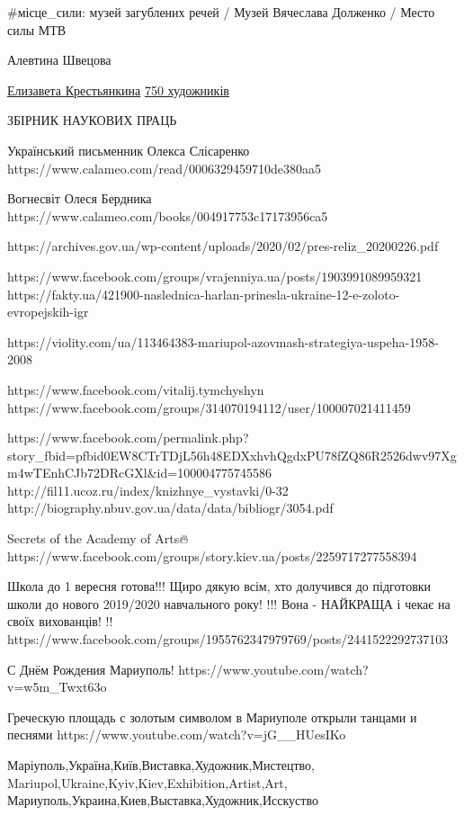 
#місце_сили: музей загублених речей / Музей Вячеслава Долженко / Место силы МТВ 

Алевтина Швецова

\href{https://www.facebook.com/lizakrestiankina}{Елизавета Крестьянкина}
\href{https://www.facebook.com/groups/1013559558679300}{750 художників}

ЗБІРНИК НАУКОВИХ ПРАЦЬ

Український письменник Олекса Слісаренко
https://www.calameo.com/read/0006329459710de380aa5

Вогнесвіт Олеся Бердника
https://www.calameo.com/books/004917753c17173956ca5

https://archives.gov.ua/wp-content/uploads/2020/02/pres-reliz_20200226.pdf

https://www.facebook.com/groups/vrajenniya.ua/posts/1903991089959321
https://fakty.ua/421900-naslednica-harlan-prinesla-ukraine-12-e-zoloto-evropejskih-igr

https://violity.com/ua/113464383-mariupol-azovmash-strategiya-uspeha-1958-2008

https://www.facebook.com/vitalij.tymchyshyn
https://www.facebook.com/groups/314070194112/user/100007021411459

https://www.facebook.com/permalink.php?story_fbid=pfbid0EW8CTrTDjL56h48EDXxhvhQgdxPU78fZQ86R2526dwv97Xgm4wTEnhCJb72DRcGXl&id=100004775745586
http://fil11.ucoz.ru/index/knizhnye_vystavki/0-32
http://biography.nbuv.gov.ua/data/data/bibliogr/3054.pdf

Secrets of the Academy of Arts🔥
https://www.facebook.com/groups/story.kiev.ua/posts/2259717277558394

Школа до 1 вересня готова!!!  Щиро дякую всім,  хто долучився до підготовки школи до нового 2019/2020
навчального року! !!!  Вона - НАЙКРАЩА і чекає на своїх вихованців! !!
https://www.facebook.com/groups/1955762347979769/posts/2441522292737103

С Днём Рождения Мариуполь!
https://www.youtube.com/watch?v=w5m_Twxt63o

Греческую площадь с золотым символом в Мариуполе открыли танцами и песнями
https://www.youtube.com/watch?v=jG__HUesIKo

Маріуполь,Україна,Київ,Виставка,Художник,Мистецтво,
Mariupol,Ukraine,Kyiv,Kiev,Exhibition,Artist,Art,
Мариуполь,Украина,Киев,Выставка,Художник,Исскуство

